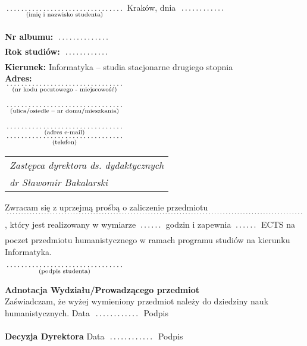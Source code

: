 \documentclass[a4paper,11pt]{article}
\newcommand{\fillField}[2]{
    $\underset{\text{#1}}{\parbox[t]{#2}{\dotfill}}$
}
\begin{document}
\noindent
\fillField{(imię i nazwisko studenta)}{5cm} \hfill Kraków, dnia \fillField{}{2cm} \\\\
\textbf{Nr albumu:}   \fillField{}{2.3cm}\\
\textbf{Rok studiów:} \fillField{}{2cm}\\
\textbf{Kierunek:} Informatyka -- studia stacjonarne drugiego stopnia\\
\textbf{Adres:}\\
\fillField{(nr kodu pocztowego - miejscowość)}{5cm}\\\\
\fillField{(ulica/osiedle – nr domu/mieszkania)}{5cm}\\\\
\fillField{(adres e-mail)}{5cm}\\
\fillField{(telefon)}{5cm}
\phantom{a}\hfill
\begin{tabular}[c]{@{}l@{}}
\textit{Zastępca dyrektora ds. dydaktycznych}\\
\textit{dr Sławomir Bakalarski}
\end{tabular}

\vskip 2.0cm


\noindent
Zwracam się z uprzejmą prośbą o zaliczenie przedmiotu\\
\fillField{}{16cm}, który jest realizowany w wymiarze \fillField{}{1cm} godzin
i zapewnia \fillField{}{1cm} ECTS na poczet
przedmiotu humanistycznego w ramach programu studiów na kierunku Informatyka.

\vskip 1cm

\hspace{\fill} \fillField{(podpis studenta)}{5cm} \hspace{2.0cm}
\vskip 3.0cm

\noindent
\textbf{Adnotacja Wydziału/Prowadzącego przedmiot} \\
Zaświadczam, że wyżej wymieniony przedmiot należy do dziedziny nauk humanistycznych.
\vskip 0.5cm
\noindent
Data \fillField{}{2cm} Podpis \dotfill

\vskip 1.5cm

\noindent
\textbf{Decyzja Dyrektora} \dotfill
\vskip 0.5cm
\noindent
Data \fillField{}{2cm} Podpis \dotfill
\end{document}
